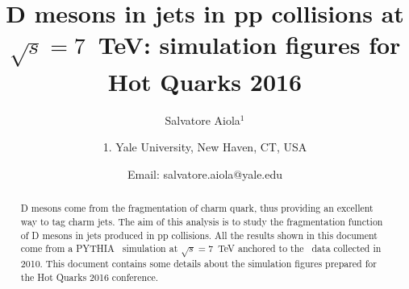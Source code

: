 \documentclass[ALICE,manyauthors]{ALICE_analysis_notes}
\begin{document}
%
%
%
\begin{titlepage}
%
\PHdate{\today}
%
\title{D mesons in jets in pp collisions at $\sqrt{s}=7$~TeV: simulation figures for Hot Quarks 2016}
%
\author{Salvatore Aiola$^{1}$}
\author{
1. Yale University, New Haven, CT, USA\\
}
\author{Email: salvatore.aiola@yale.edu}
%
%
\begin{abstract}
D mesons come from the fragmentation of charm quark, thus providing an excellent way to tag charm jets.
The aim of this analysis is to study the fragmentation function of D mesons in jets produced in pp collisions.
All the results shown in this document come from a PYTHIA \pp\ simulation at $\sqrt{s}=7$~TeV anchored to
the \pp\ data collected in 2010.
This document contains some details about the simulation figures prepared for the Hot Quarks 2016 conference.
\end{abstract}
\end{titlepage}
%
\tableofcontents
\newpage
\end{document}
